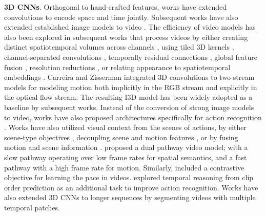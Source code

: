 \documentclass[smallextended,twocolumn,natbib]{svjour3}
\begin{document}
\noindent
\textbf{3D CNNs}. Orthogonal to hand-crafted features, works \citep{baccouche2011sequential,ji20123d,taylor2010convolutional,tran2015learning} have extended convolutions to encode space and time jointly. Subsequent works have also extended established image models to video \citep{hara2018can}. The efficiency of video models has also been explored in subsequent works that process videos by either creating distinct spatiotemporal volumes across channels \citep{chen2018multi}, using tiled 3D kernels \citep{hegde2018morph}, channel-separated convolutions \citep{jiang2019stm,luo2019grouped,tran2019video}, temporally residual connections \citep{qiu2017learning}, global feature fusion \citep{qiu2019learning}, resolution reductions \citep{chen2019drop,stergiou2021multi}, or relating appearance to spatiotemporal  embeddings \citep{wang2018appearance,zhou2018mict}. Carreira and Zisserman \citep{carreira2017quo} integrated 3D convolutions to two-stream models for modeling motion both implicitly in the RGB stream and explicitly in the optical flow stream. The resulting I3D model has been widely adopted as a baseline by subsequent works. Instead of the conversion of strong image models to video, works have also proposed architectures specifically for action recognition \citep{feichtenhofer2020x3d,kondratyuk2021movinets,liu2022convnet}. Works have also utilized visual context from the scenes of actions, by either scene-type objectives \citep{choi2019can}, decoupling scene and motion features \citep{wang2021enhancing}, or by fusing motion and scene information \citep{stergiou2021learn}. \citet{feichtenhofer2019slowfast} proposed a dual pathway video model; with a slow pathway operating over low frame rates for spatial semantics, and a fast pathway with a high frame rate for motion. Similarly, \citet{wang2020self} included a contrastive objective for learning the pace in videos. \citet{xu2019self} explored temporal reasoning from clip order prediction as an additional task to improve action recognition. Works \citep{ji2020action,hussein2019timeception,varol2017long} have also extended 3D CNNs to longer sequences by segmenting videos with multiple temporal patches.
\end{document}
